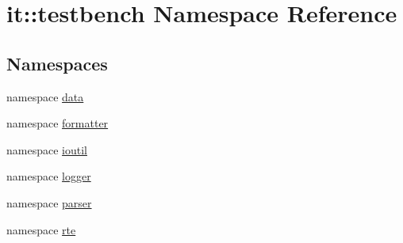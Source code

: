 \hypertarget{namespaceit_1_1testbench}{\section{it\-:\-:testbench Namespace Reference}
\label{dc/dda/namespaceit_1_1testbench}
}
\subsection*{Namespaces}
\begin{DoxyCompactItemize}
\item 
namespace \hyperlink{namespaceit_1_1testbench_1_1data}{data}
\item 
namespace \hyperlink{namespaceit_1_1testbench_1_1formatter}{formatter}
\item 
namespace \hyperlink{namespaceit_1_1testbench_1_1ioutil}{ioutil}
\item 
namespace \hyperlink{namespaceit_1_1testbench_1_1logger}{logger}
\item 
namespace \hyperlink{namespaceit_1_1testbench_1_1parser}{parser}
\item 
namespace \hyperlink{namespaceit_1_1testbench_1_1rte}{rte}
\end{DoxyCompactItemize}
